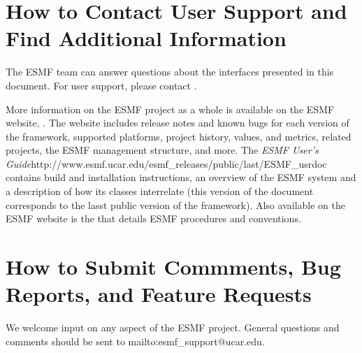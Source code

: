 \section{How to Contact User Support and Find Additional Information}
\label{sec:Support}
The ESMF team can answer questions about the interfaces presented in this 
document.  For user support, please contact 
.  

More information on the ESMF project as a whole is available on the 
ESMF website, .  
The website includes release notes and known bugs for each version of the
framework, supported platforms, project history, values, and metrics, related projects,
the ESMF management structure, and more.  The \htmladdnormallink
{{\it ESMF User's Guide}}{http://www.esmf.ucar.edu/esmf_releases/public/last/ESMF_usrdoc} contains build and installation instructions, an overview of the ESMF system and a description of 
how its classes interrelate (this version of the document corresponds to the lasst public version of the framework).  Also available on the ESMF website is the 
that details ESMF procedures and conventions.  
 
\section{How to Submit Commments, Bug Reports, and Feature Requests}
\label{sec:Submission}
We welcome input on any aspect of the ESMF project.  General 
questions and comments should be sent to 
{mailto:esmf_support@ucar.edu}.







